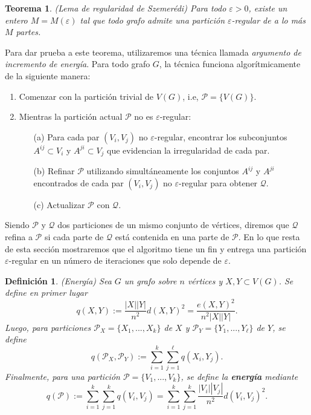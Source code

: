 \documentclass{article}[14pts]
\newtheorem{teorema}{Teorema}
\newtheorem{definicion}{Definición}
\let\varepsilon=\varepsilon
\begin{document}
\begin{teorema} \label{szemeredi_regularity_lemma} (Lema de regularidad de Szemerédi)
    Para todo $\varepsilon > 0$, existe un entero $M = M(\varepsilon)$ tal que todo grafo admite una partición $\varepsilon$-regular de a lo más $M$ partes.
\end{teorema}\medskip

Para dar prueba a este teorema, utilizaremos una técnica llamada \emph{argumento de incremento de energía}. Para todo grafo $G$, la técnica funciona algorítmicamente de la siguiente manera:\medskip

\begin{enumerate}
    \item Comenzar con la partición trivial de $V(G)$, i.e, $\mathcal{P} = \lbrace V(G)\rbrace$.

    \item Mientras la partición actual $\mathcal{P}$ no es $\varepsilon$-regular:
    \begin{itemize}
        \item[(a)] Para cada par $(V_i, V_j)$ no $\varepsilon$-regular, encontrar los subconjuntos $A^{ij}\subset V_i$ y $A^{ji}\subset V_j$ que evidencian la irregularidad de cada par.

        \item[(b)] \label{Paso 2b} Refinar $\mathcal{P}$ utilizando simultáneamente los conjuntos $A^{ij}$ y $A^{ji}$ encontrados de cada par $(V_i, V_j)$ no $\varepsilon$-regular para obtener $\mathcal{Q}$. 

        \item[(c)] Actualizar $\mathcal{P}$ con $\mathcal{Q}$. 
    \end{itemize}
\end{enumerate}\medskip

Siendo $\mathcal{P}$ y $\mathcal{Q}$ dos particiones de un mismo conjunto de vértices, diremos que $\mathcal{Q}$ refina a $\mathcal{P}$ si cada parte de $\mathcal{Q}$ está contenida en una parte de $\mathcal{P}$. En lo que resta de esta sección mostraremos que el algoritmo tiene un fin y entrega una partición $\varepsilon$-regular en un número de iteraciones que solo depende de $\varepsilon$.\medskip

\begin{definicion} (Energía)
    Sea $G$ un grafo sobre $n$ vértices y $X,Y\subset V(G)$. Se define en primer lugar
    \[
    q(X,Y) := \frac{|X||Y|}{n^{2}}d(X,Y)^{2} = \frac{e(X,Y)^{2}}{n^{2}|X||Y|}.
    \]
    Luego, para particiones $\mathcal{P}_{X} = \lbrace X_1,...,X_k\rbrace$ de $X$ y $\mathcal{P}_{Y} = \lbrace Y_1,...,Y_\ell\rbrace$ de $Y$, se define
    \[
    q(\mathcal{P}_{X}, \mathcal{P}_{Y}) := \sum_{i = 1}^{k}\sum_{j = 1}^{\ell} q(X_i, Y_j).
    \]
    Finalmente, para una partición $\mathcal{P} = \lbrace V_1,...,V_k \rbrace$, se define la \textbf{energía} mediante
    \[
    q(\mathcal{P}) := \sum_{i = 1}^{k}\sum_{j = 1}^{k}q(V_i, V_j) = \sum_{i = 1}^{k}\sum_{j = 1}^{k} \frac{|V_i||V_j|}{n^{2}}d(V_i, V_j)^{2}. 
    \]
\end{definicion}\medskip
\end{document}
